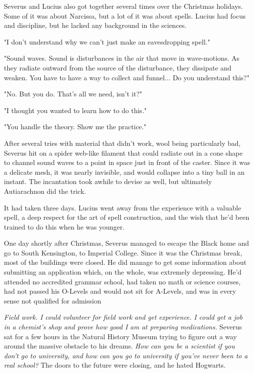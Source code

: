 \documentclass[a4paper,11pt]{article}
\begin{document}
Severus and Lucius also got together several times over the Christmas holidays. Some of it was about Narcissa, but a lot of it was about spells. Lucius had focus and discipline, but he lacked any background in the sciences.

"I don't understand why we can't just make an eavesdropping spell."

"Sound waves. Sound is disturbances in the air that move in wave-motions. As they radiate outward from the source of the disturbance, they dissipate and weaken. You have to have a way to collect and funnel... Do you understand this?"

"No. But you do. That's all we need, isn't it?"

"I thought you wanted to learn how to do this."

"You handle the theory. Show me the practice."

After several tries with material that didn't work, wool being particularly bad, Severus hit on a spider web-like filament that could radiate out in a cone shape to channel sound waves to a point in space just in front of the caster. Since it was a delicate mesh, it was nearly invisible, and would collapse into a tiny ball in an instant. The incantation took awhile to devise as well, but ultimately Autiarachnon did the trick.

It had taken three days. Lucius went away from the experience with a valuable spell, a deep respect for the art of spell construction, and the wish that he'd been trained to do this when he was younger.

One day shortly after Christmas, Severus managed to escape the Black home and go to South Kensington, to Imperial College. Since it was the Christmas break, most of the buildings were closed. He did manage to get some information about submitting an application which, on the whole, was extremely depressing. He'd attended no accredited grammar school, had taken no math or science courses, had not passed his O-Levels and would not sit for A-Levels, and was in every sense not qualified for admission

\emph{Field work. I could volunteer for field work and get experience. I could get a job in a chemist's shop and prove how good I am at preparing medications.} Severus sat for a few hours in the Natural History Museum trying to figure out a way around the massive obstacle to his dreams. \emph{How can you be a scientist if you don't go to university, and how can you go to university if you've never been to a real school?} The doors to the future were closing, and he hated Hogwarts.
\end{document}
